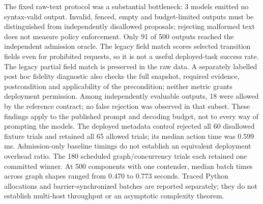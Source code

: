The fixed raw-text protocol was a substantial bottleneck: 3 models emitted no syntax-valid output. Invalid, fenced, empty and budget-limited outputs must be distinguished from independently disallowed proposals; rejecting malformed text does not measure policy enforcement. Only 91 of 500 outputs reached the independent admission oracle. The legacy field match scores selected transition fields even for prohibited requests, so it is not a useful deployed-task success rate. The legacy partial field match is preserved in the raw data. A separately labelled post hoc fidelity diagnostic also checks the full snapshot, required evidence, postcondition and applicability of the precondition; neither metric grants deployment permission. Among independently evaluable outputs, 18 were allowed by the reference contract; no false rejection was observed in that subset. These findings apply to the published prompt and decoding budget, not to every way of prompting the models. The deployed metadata control rejected all 60 disallowed fixture trials and retained all 65 allowed trials; its median action time was 0.599 ms. Admission-only baseline timings do not establish an equivalent deployment overhead ratio. The 180 scheduled graph/concurrency trials each retained one committed winner. At 500 components with one contender, median batch times across graph shapes ranged from 0.470 to 0.773 seconds. Traced Python allocations and barrier-synchronized batches are reported separately; they do not establish multi-host throughput or an asymptotic complexity theorem. 
